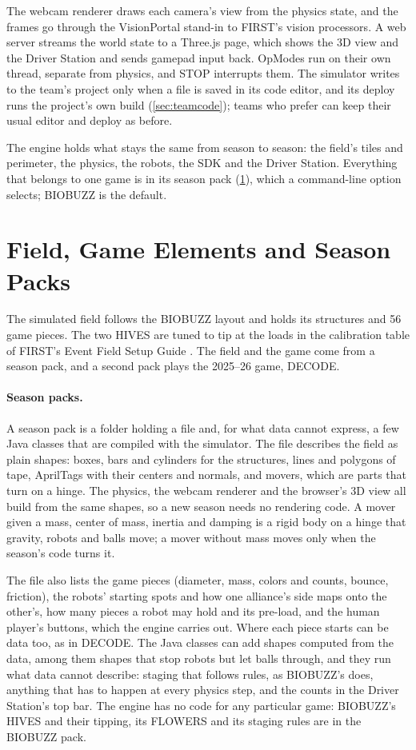 \documentclass[10pt,twocolumn,letterpaper]{article}
\begin{document}
The webcam renderer draws each camera's view from the physics state, and the frames go through the VisionPortal stand-in to FIRST's vision processors. A web server streams the world state to a Three.js \citep{threejs} page, which shows the 3D view and the Driver Station and sends gamepad input back. OpModes run on their own thread, separate from physics, and STOP interrupts them. The simulator writes to the team's project only when a file is saved in its code editor, and its deploy runs the project's own build (\cref{sec:teamcode}); teams who prefer can keep their usual editor and deploy as before.

The engine holds what stays the same from season to season: the field's tiles and perimeter, the physics, the robots, the SDK and the Driver Station. Everything that belongs to one game is in its season pack (\cref{sec:field}), which a command-line option selects; BIOBUZZ is the default.

\section{Field, Game Elements and Season Packs}\label{sec:field}

The simulated field follows the BIOBUZZ layout and holds its structures and 56 game pieces. The two HIVES are tuned to tip at the loads in the calibration table of FIRST's Event Field Setup Guide \citep{first2026fieldsetup}. The field and the game come from a season pack, and a second pack plays the 2025–26 game, DECODE.

\paragraph{Season packs.} A season pack is a folder holding a  file and, for what data cannot express, a few Java classes that are compiled with the simulator. The file describes the field as plain shapes: boxes, bars and cylinders for the structures, lines and polygons of tape, AprilTags with their centers and normals, and movers, which are parts that turn on a hinge. The physics, the webcam renderer and the browser's 3D view all build from the same shapes, so a new season needs no rendering code. A mover given a mass, center of mass, inertia and damping is a rigid body on a hinge that gravity, robots and balls move; a mover without mass moves only when the season's code turns it.

The file also lists the game pieces (diameter, mass, colors and counts, bounce, friction), the robots' starting spots and how one alliance's side maps onto the other's, how many pieces a robot may hold and its pre-load, and the human player's buttons, which the engine carries out. Where each piece starts can be data too, as in DECODE. The Java classes can add shapes computed from the data, among them shapes that stop robots but let balls through, and they run what data cannot describe: staging that follows rules, as BIOBUZZ's does, anything that has to happen at every physics step, and the counts in the Driver Station's top bar. The engine has no code for any particular game: BIOBUZZ's HIVES and their tipping, its FLOWERS and its staging rules are in the BIOBUZZ pack.
\end{document}
